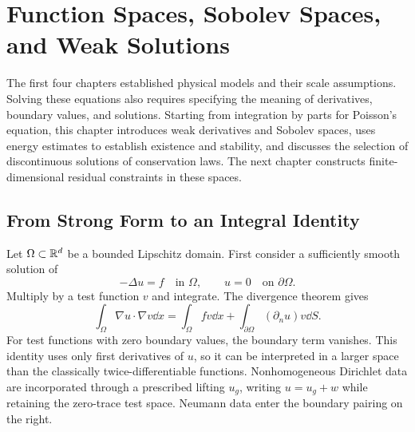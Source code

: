 \chapter{Function Spaces, Sobolev Spaces, and Weak Solutions}\label{ch:5}
\begin{chaptersummary}
The first four chapters established physical models and their scale assumptions. Solving these equations also requires specifying the meaning of derivatives, boundary values, and solutions. Starting from integration by parts for Poisson's equation, this chapter introduces weak derivatives and Sobolev spaces, uses energy estimates to establish existence and stability, and discusses the selection of discontinuous solutions of conservation laws. The next chapter constructs finite-dimensional residual constraints in these spaces.
\end{chaptersummary}

\section{From Strong Form to an Integral Identity}
Let $\Omega\subset\mathbb R^d$ be a bounded Lipschitz domain. First consider a sufficiently smooth solution of
\[
-\Delta u=f\quad\text{in }\Omega,\qquad u=0\quad\text{on }\partial\Omega.
\]
Multiply by a test function $v$ and integrate. The divergence theorem gives
\begin{equation}\label{eq:poisson-green}
\int_\Omega\nabla u\cdot\nabla v\dd x
=\int_\Omega fv\dd x+\int_{\partial\Omega}(\partial_nu)v\dd S.
\end{equation}
For test functions with zero boundary values, the boundary term vanishes. This identity uses only first derivatives of $u$,
so it can be interpreted in a larger space than the classically twice-differentiable functions.
Nonhomogeneous Dirichlet data are incorporated through a prescribed lifting $u_g$, writing $u=u_g+w$ while retaining the zero-trace test space.
Neumann data enter the boundary pairing on the right.

